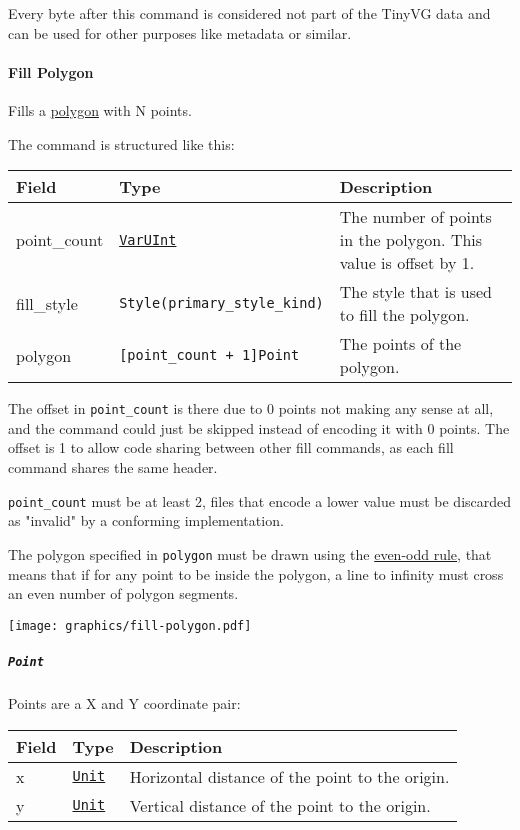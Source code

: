 \documentclass[]{article}
\begin{document}
Every byte after this command is considered not part of the TinyVG data
and can be used for other purposes like metadata or similar.

\hypertarget{fill-polygon}{%
\paragraph{Fill Polygon}\label{fill-polygon}}

Fills a \href{https://en.wikipedia.org/wiki/Polygon}{polygon} with N
points.

The command is structured like this:

\begin{longtable}[]{@{}p{1in}p{2in}p{3in}@{}}
\toprule
Field & Type & Description \\
\midrule
\endhead
point\_count & \protect\hyperlink{varuint}{\texttt{VarUInt}} & The
number of points in the polygon. This value is offset by 1. \\
fill\_style & \texttt{Style(primary\_style\_kind)} & The style that is
used to fill the polygon. \\
polygon & \texttt{{[}point\_count\ +\ 1{]}Point} & The points of the
polygon. \\
\bottomrule
\end{longtable}

The offset in \texttt{point\_count} is there due to 0 points not making
any sense at all, and the command could just be skipped instead of encoding
it with 0 points. The offset is 1 to allow code sharing between other
fill commands, as each fill command shares the same header.

\texttt{point\_count} must be at least 2, files that encode a lower
value must be discarded as "invalid" by a conforming implementation.

The polygon specified in \texttt{polygon} must be drawn using the
\href{https://en.wikipedia.org/wiki/Even\%E2\%80\%93odd_rule}{even-odd
rule}, that means that if for any point to be inside the polygon, a line
to infinity must cross an even number of polygon segments.


\texttt{[image: graphics/fill-polygon.pdf]}

\hypertarget{point}{%
\subparagraph{\texorpdfstring{\texttt{Point}}{Point}}\label{point}}

Points are a X and Y coordinate pair:

\begin{longtable}[]{@{}p{1in}p{2in}p{3in}@{}}
\toprule
Field & Type & Description \\
\midrule
\endhead
x & \protect\hyperlink{units}{\texttt{Unit}} & Horizontal distance of
the point to the origin. \\
y & \protect\hyperlink{units}{\texttt{Unit}} & Vertical distance of the
point to the origin. \\
\bottomrule
\end{longtable}
\end{document}
